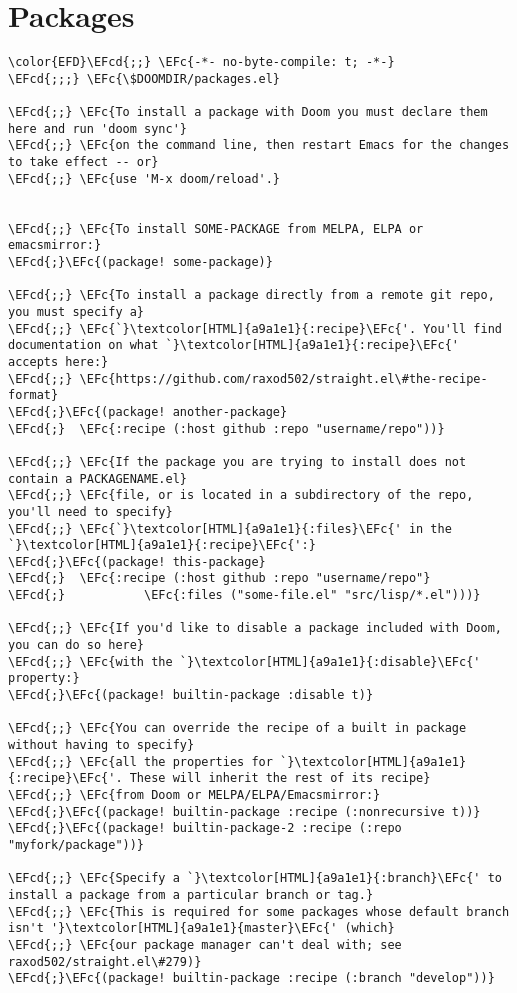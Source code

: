 \documentclass[a4wide,10pt]{article}
\newcommand{\EFc}[1]{\textcolor{EFc}{#1}} %
\newcommand{\EFcd}[1]{\textcolor{EFcd}{#1}} %
\begin{document}
\section{Packages}
\label{sec:org855ab50}
\begin{Code}
\begin{Verbatim}
\color{EFD}\EFcd{;;} \EFc{-*- no-byte-compile: t; -*-}
\EFcd{;;;} \EFc{\$DOOMDIR/packages.el}

\EFcd{;;} \EFc{To install a package with Doom you must declare them here and run 'doom sync'}
\EFcd{;;} \EFc{on the command line, then restart Emacs for the changes to take effect -- or}
\EFcd{;;} \EFc{use 'M-x doom/reload'.}


\EFcd{;;} \EFc{To install SOME-PACKAGE from MELPA, ELPA or emacsmirror:}
\EFcd{;}\EFc{(package! some-package)}

\EFcd{;;} \EFc{To install a package directly from a remote git repo, you must specify a}
\EFcd{;;} \EFc{`}\textcolor[HTML]{a9a1e1}{:recipe}\EFc{'. You'll find documentation on what `}\textcolor[HTML]{a9a1e1}{:recipe}\EFc{' accepts here:}
\EFcd{;;} \EFc{https://github.com/raxod502/straight.el\#the-recipe-format}
\EFcd{;}\EFc{(package! another-package}
\EFcd{;}  \EFc{:recipe (:host github :repo "username/repo"))}

\EFcd{;;} \EFc{If the package you are trying to install does not contain a PACKAGENAME.el}
\EFcd{;;} \EFc{file, or is located in a subdirectory of the repo, you'll need to specify}
\EFcd{;;} \EFc{`}\textcolor[HTML]{a9a1e1}{:files}\EFc{' in the `}\textcolor[HTML]{a9a1e1}{:recipe}\EFc{':}
\EFcd{;}\EFc{(package! this-package}
\EFcd{;}  \EFc{:recipe (:host github :repo "username/repo"}
\EFcd{;}           \EFc{:files ("some-file.el" "src/lisp/*.el")))}

\EFcd{;;} \EFc{If you'd like to disable a package included with Doom, you can do so here}
\EFcd{;;} \EFc{with the `}\textcolor[HTML]{a9a1e1}{:disable}\EFc{' property:}
\EFcd{;}\EFc{(package! builtin-package :disable t)}

\EFcd{;;} \EFc{You can override the recipe of a built in package without having to specify}
\EFcd{;;} \EFc{all the properties for `}\textcolor[HTML]{a9a1e1}{:recipe}\EFc{'. These will inherit the rest of its recipe}
\EFcd{;;} \EFc{from Doom or MELPA/ELPA/Emacsmirror:}
\EFcd{;}\EFc{(package! builtin-package :recipe (:nonrecursive t))}
\EFcd{;}\EFc{(package! builtin-package-2 :recipe (:repo "myfork/package"))}

\EFcd{;;} \EFc{Specify a `}\textcolor[HTML]{a9a1e1}{:branch}\EFc{' to install a package from a particular branch or tag.}
\EFcd{;;} \EFc{This is required for some packages whose default branch isn't '}\textcolor[HTML]{a9a1e1}{master}\EFc{' (which}
\EFcd{;;} \EFc{our package manager can't deal with; see raxod502/straight.el\#279)}
\EFcd{;}\EFc{(package! builtin-package :recipe (:branch "develop"))}


\end{Verbatim}
\end{Code}
\end{document}
